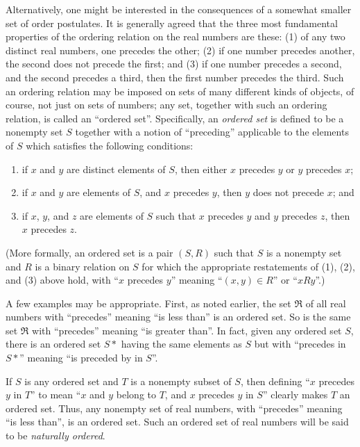 \documentclass{article}
\begin{document}
Alternatively, one might be interested in the consequences of a somewhat smaller set of order postulates. It is generally agreed that the three most fundamental properties of the ordering relation on the real numbers are these: (1) of any two distinct real numbers, one precedes the other; (2) if one number precedes another, the second does not precede the first; and (3) if one number precedes a second, and the second precedes a third, then the first number precedes the third. Such an ordering relation may be imposed on sets of many different kinds of objects, of course, not just on sets of numbers; any set, together with such an ordering relation, is called an ``ordered set''. Specifically, an \emph{ordered set} is defined to be a nonempty set $S$ together with a notion of ``preceding'' applicable to the elements of $S$ which satisfies the following conditions:
\begin{enumerate}[\vspace{1cm}(1)]
  \item if $x$ and $y$ are distinct elements of $S$, then either $x$ precedes $y$ or $y$ precedes $x$;
  \item if $x$ and $y$ are elements of $S$, and $x$ precedes $y$, then $y$ does not precede $x$; and
  \item if $x$, $y$, and $z$ are elements of $S$ such that $x$ precedes $y$ and $y$ precedes $z$, then $x$ precedes $z$.
\end{enumerate}

(More formally, an ordered set is a pair $(S,R)$ such that $S$ is a nonempty set and $R$ is a binary relation on $S$ for which the appropriate restatements of (1), (2), and (3) above hold, with ``$x$ precedes $y$'' meaning ``$(x,y) \in R$'' or ``$xRy$''.)

A few examples may be appropriate. First, as noted earlier, the set $\Re$ of all real numbers with ``precedes'' meaning ``is less than'' is an ordered set. So is the same set $\Re$ with ``precedes'' meaning ``is greater than''. In fact, given any ordered set $S$, there is an ordered set $S*$ having the same elements as $S$ but with ``precedes in $S*$'' meaning ``is preceded by in $S$''.

If $S$ is any ordered set and $T$ is a nonempty subset of $S$, then defining ``$x$ precedes $y$ in $T$'' to mean ``$x$ and $y$ belong to $T$, and $x$ precedes $y$ in $S$'' clearly makes $T$ an ordered set. Thus, any nonempty set of real numbers, with ``precedes'' meaning ``is less than'', is an ordered set. Such an ordered set of real numbers will be said to be \emph{naturally ordered}.
\end{document}
